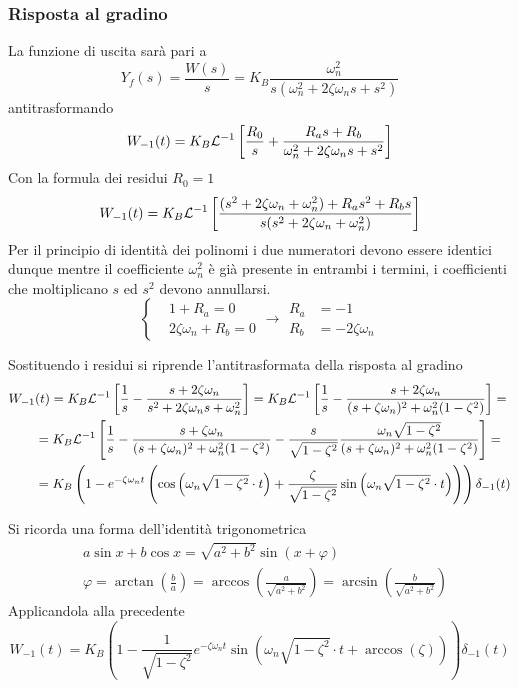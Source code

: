 \subsubsection{Risposta al gradino}
La funzione di uscita sarà pari a
$$
Y_f(s) = \frac{W(s)}{s} = K_B\frac{\omega_n^2}{s(\omega_n^2 + 2\zeta\omega_n s
+s^2)}
$$
antitrasformando
$$
W_{-1}(t) = K_B \mathcal{L}^{-1} \left[\frac{R_0}{s} + \frac{R_as+R_b}
{\omega_n^2 +2\zeta\omega_n s+s^2}\right]
$$
Con la formula dei residui $R_0=1$
$$
W_{-1}(t) = K_B \mathcal{L}^{-1} \left[\frac{(s^2+2\zeta\omega_n+\omega_n^2)
+R_as^2+R_bs}
{s(s^2+2\zeta\omega_n+\omega_n^2)}\right]
$$
Per il principio di identità dei polinomi i due numeratori devono essere
identici dunque mentre il coefficiente $\omega_n^2$ è già presente in entrambi
i termini, i coefficienti che moltiplicano $s$ ed $s^2$ devono annullarsi.
$$\left\{\begin{aligned}
&1+R_a = 0\\
&2\zeta\omega_n + R_b = 0
\end{aligned}\right.\longrightarrow
\begin{aligned}
R_a &= -1\\
R_b &= -2\zeta\omega_n
\end{aligned}
$$

Sostituendo i residui si riprende l'antitrasformata della risposta al gradino
$$\begin{aligned}
W_{-1}&(t) = K_B\mathcal{L}^{-1}\left[ \frac{1}{s}-\frac{s+2\zeta\omega_n}
{s^2+2\zeta\omega_ns+\omega_n^2} \right]=
K_B\mathcal{L}^{-1}\left[\frac{1}{s} - \frac{s+2\zeta\omega_n}
{(s+\zeta\omega_n)^2+\omega_n^2(1-\zeta^2)}
\right]=\\
&=K_B\mathcal{L}^{-1}\left[\frac{1}{s} -
\frac{s+\zeta\omega_n}{(s+\zeta\omega_n)^2
+\omega_n^2(1-\zeta^2)}- \frac{s}{\sqrt{1-\zeta^2}}
\frac{\omega_n\sqrt{1-\zeta^2}}{(s+\zeta\omega_n)^2 +
\omega_n^2(1-\zeta^2)}\right]=\\
&=K_B\left(1 -e^{-\zeta\omega_n t}\left(\cos\left(\omega_n\sqrt{1-\zeta^2}\cdot
t\right)+
\frac{\zeta}{\sqrt{1-\zeta^2}}
\sin\left(\omega_n \sqrt{1-\zeta^2}\cdot t\right)\right)
\right)\delta_{-1}(t)
\end{aligned}$$

Si ricorda una forma dell'identità trigonometrica
$$\begin{aligned}
&a\sin x + b\cos x = \sqrt{a^2+b^2}\sin\left(x+\varphi\right)\\
&\varphi = \arctan\left(\frac{b}{a}\right) =
\arccos\left(\frac{a}{\sqrt{a^2+b^2}}\right) =
\arcsin\left(\frac{b}{\sqrt{a^2+b^2}}\right)
\end{aligned}
$$
Applicandola alla precedente
$$
W_{-1}(t) = K_B\left( 1-\frac{1}{\sqrt{1-\zeta^2}}e^{-\zeta\omega_n
t}\sin\left( \omega_n\sqrt{1-\zeta^2}\cdot t + \arccos(\zeta) \right)
\right)\delta_{-1}(t)
$$

